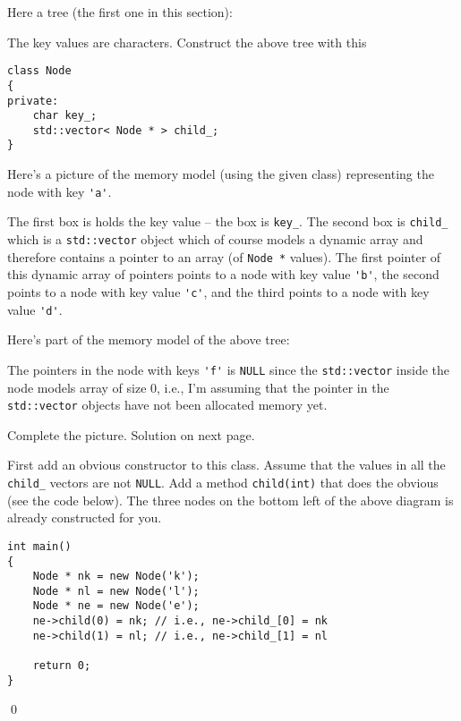 \newpage
\begin{ex}
  Here a tree (the first one in this section):
  
  
The key values are characters.
Construct the above tree with this
\begin{Verbatim}[frame=single]
class Node
{
private:
    char key_;
    std::vector< Node * > child_;
}
\end{Verbatim}


Here's a picture of the memory model (using the given class)
representing the node with key \verb!'a'!.



The first box is holds the key value -- the box is \texttt{key\_}.
The second box is \texttt{child\_} which is a \texttt{std::vector} object
which of course models a dynamic array and therefore
contains a pointer to an array (of \texttt{Node *} values).
The first pointer of this dynamic array  of pointers points to a node with key value
\verb!'b'!,
the second points to a node with key value \verb!'c'!, and 
the third points to a node with key value \verb!'d'!.



Here's part of the memory model of the above tree:



The pointers in the node with keys \verb!'f'! is \verb!NULL!
since the \verb!std::vector! inside the node models array of size 0,
i.e., I'm assuming that the pointer in the \verb!std::vector! objects
have not been allocated memory yet.

Complete the picture. Solution on next page.

\newpage



\begin{ex}
First add an obvious constructor to this class.
Assume that the values in all the \verb!child_!
vectors are not \texttt{NULL}.
Add a method \texttt{child(int)} that does the obvious (see
the code below).
The three nodes on the bottom left of the above diagram is
already constructed for you.

\begin{Verbatim}[frame=single]
int main()
{
    Node * nk = new Node('k');
    Node * nl = new Node('l');
    Node * ne = new Node('e');
    ne->child(0) = nk; // i.e., ne->child_[0] = nk
    ne->child(1) = nl; // i.e., ne->child_[1] = nl
    
    return 0;
}
\end{Verbatim}
\qed
\end{ex}
\end{ex}



